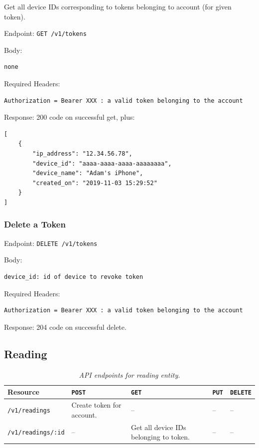 \documentclass[12pt,openany,a4paper]{book}
\begin{document}
Get all device IDs corresponding to tokens belonging to account (for given token).

Endpoint: \verb|GET /v1/tokens|

Body:
\begin{verbatim}
none
\end{verbatim}

Required Headers:

\begin{verbatim}
Authorization = Bearer XXX : a valid token belonging to the account
\end{verbatim}

Response: 200 code on successful get, plus:

\begin{verbatim}
[
	{
		"ip_address": "12.34.56.78",
		"device_id": "aaaa-aaaa-aaaa-aaaaaaaa",
		"device_name": "Adam's iPhone",
		"created_on": "2019-11-03 15:29:52"
	}
]
\end{verbatim}

\subsubsection{Delete a Token}

Endpoint: \verb|DELETE /v1/tokens|

Body:

\begin{verbatim}
device_id: id of device to revoke token
\end{verbatim}

Required Headers: 

\begin{verbatim}
Authorization = Bearer XXX : a valid token belonging to the account
\end{verbatim}

Response: 204 code on successful delete.

\subsection{Reading}

\begin{table}[h]
\caption{\sl API endpoints for reading entity.}
\label{tab:endpoint_reading}
\begin{center}
\begin{tabularx}{\linewidth}{|l|X|X|X|X|}
\hline
Resource & \verb|POST| & \verb|GET| & \verb|PUT| & \verb|DELETE| \\
\hline
\verb|/v1/readings| & Create token for account. & -- & -- & -- \\
\verb|/v1/readings/:id| & -- & Get all device IDs belonging to token. & -- & -- \\
\hline
\end{tabularx}
\end{center}
\end{table}
\end{document}
